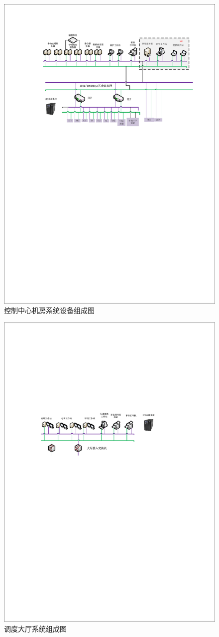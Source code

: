 \begin{figure}[h]
	\centering
	\includegraphics[width=0.7\linewidth]{figures/控制中心机房系统设备组成图}
	\caption{控制中心机房系统设备组成图}
	\label{fig:控制中心机房系统设备组成图}
\end{figure}
\begin{figure}[ht]
	\centering
	\includegraphics[width=0.7\linewidth]{figures/调度大厅系统组成图}
	\caption{调度大厅系统组成图}
	\label{fig:调度大厅系统组成图}
\end{figure}



